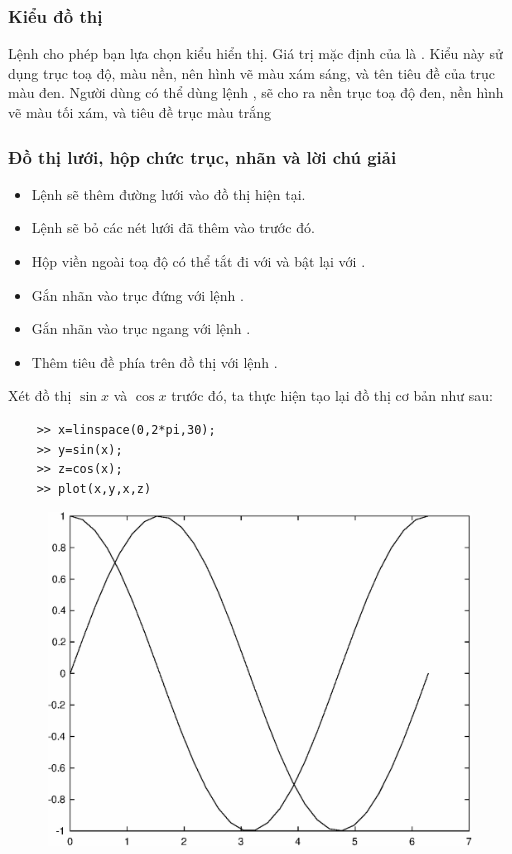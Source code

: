 \documentclass[12pt,a4paper]{article}
\begin{document}
\subsubsection{Kiểu đồ thị}
Lệnh  cho phép bạn lựa chọn kiểu hiển thị. Giá trị mặc định của  là . Kiểu này sử dụng trục toạ độ, màu nền, nên hình vẽ màu xám sáng, và tên tiêu đề của trục màu đen. Người dùng có thể dùng lệnh , sẽ cho ra nền trục toạ độ đen, nền hình vẽ màu tối xám, và tiêu đề trục màu trắng
\subsubsection{Đồ thị lưới, hộp chức trục, nhãn và lời chú giải}
\begin{itemize}
	\item Lệnh  sẽ thêm đường lưới vào đồ thị hiện tại.
	\item Lệnh  sẽ bỏ các nét lưới đã thêm vào trước đó.
	\item Hộp viền ngoài toạ độ có thể tắt đi với  và bật lại với .
	\item Gắn nhãn vào trục đứng với lệnh .
	\item Gắn nhãn vào trục ngang với lệnh .
	\item Thêm tiêu đề phía trên đồ thị với lệnh .
\end{itemize}
Xét đồ thị $\sin{x}$ và $\cos{x}$ trước đó, ta thực hiện tạo lại đồ thị cơ bản như sau:
\begin{lstlisting}
	>> x=linspace(0,2*pi,30);
	>> y=sin(x);
	>> z=cos(x);
	>> plot(x,y,x,z)
\end{lstlisting}
\begin{center}
	\begin{figure}[H]
	\begin{center}
		\includegraphics[scale=0.6]{hinhtieuluan/dothi2}
	\end{center}
		\caption{}
		\label{refdothi2}
	\end{figure}
\end{center}
\end{document}
